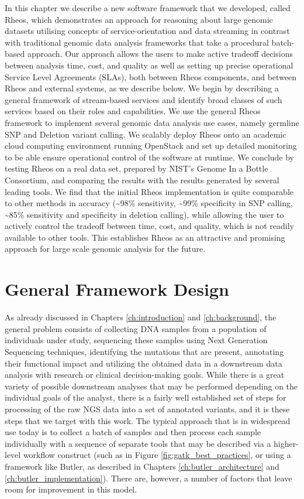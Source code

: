 In this chapter we describe a new software framework that we developed, called Rheos, which demonstrates an approach for reasoning about large genomic datasets utilising concepts of service-orientation and data streaming in contrast with traditional genomic data analysis frameworks\autocite{depristo2011framework} that take a procedural batch-based approach. Our approach allows the users to make active tradeoff decisions between analysis time, cost, and quality as well as setting up precise operational Service Level Agreements (SLAs), both between Rheos components, and between Rheos and external systems, as we describe below. We begin by describing a general framework of stream-based services and identify broad classes of such services based on their roles and capabilities. We use the general Rheos framework to implement several genomic data analysis use cases, namely germline SNP and Deletion variant calling. We scalably deploy Rheos onto an academic cloud computing environment running OpenStack and set up detailed monitoring to be able ensure operational control of the software at runtime. We conclude by testing Rheos on a real data set, prepared by NIST's Genome In a Bottle Consortium, and comparing the results with the results generated by several leading tools. We find that the initial Rheos implementation is quite comparable to other methods in accuracy (\textasciitilde98\% sensitivity, \textasciitilde99\% specificity in SNP calling, \textasciitilde85\% sensitivity and specificity in deletion calling), while allowing the user to actively control the tradeoff between time, cost, and quality, which is not readily available to other tools. This establishes Rheos as an attractive and promising approach for large scale genomic analysis for the future. 

\section{General Framework Design}\label{sec:rheos_general_framework_design}

As already discussed in Chapters \ref{ch:introduction} and \ref{ch:background}, the general problem consists of collecting DNA samples from a population of individuals under study, sequencing these samples using Next Generation Sequencing techniques, identifying the mutations that are present, annotating their functional impact and utilizing the obtained data in a downstream data analysis with research or clinical decision-making goals. While there is a great variety of possible downstream analyses that may be performed depending on the individual goals of the analyst, there is a fairly well established set of steps for processing of the raw NGS data into a set of annotated variants, and it is these steps that we target with this work. The typical approach that is in widespread use today is to collect a batch of samples and then process each sample individually with a sequence of separate tools that may be described via a higher-level workflow construct (such as in Figure \ref{fig:gatk_best_practices}, or using a framework like Butler, as described in Chapters \ref{ch:butler_architecture} and \ref{ch:butler_implementation}). There are, however, a number of factors that leave room for improvement in this model. 

